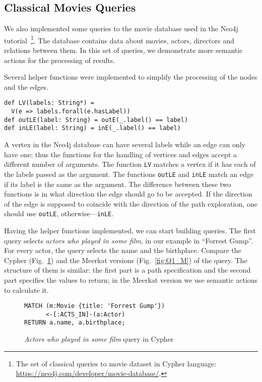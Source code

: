 \subsection{Classical Movies Queries}

We also implemented some queries to the movie database used in the Neo4j tutorial~\footnote{The set of classical queries to movie dataset in Cypher language: \url{https://neo4j.com/developer/movie-database/}.}.
The database contains data about movies, actors, directors and relations between them.
In this set of queries, we demonstrate more semantic actions for the processing of results.

Several helper functions were implemented to simplify the processing of the nodes and the edges.

\begin{lstlisting}
def LV(labels: String*) =
  V(e => labels.forall(e.hasLabel))
def outLE(label: String) = outE(_.label() == label)
def inLE(label: String) = inE(_.label() == label)
\end{lstlisting}

A vertex in the Neo4j database can have several labels while an edge can only have one; thus the functions for the handling of vertices and edges accept a different number of arguments.
The function \lstinline{LV} matches a vertex if it has each of the labels passed as the argument.
The functions \lstinline{outLE} and \lstinline{inLE} match an edge if its label is the same as the argument.
The difference between these two functions is in what direction the edge should go to be accepted.
If the direction of the edge is supposed to coincide with the direction of the path exploration, one should use \lstinline{outLE}, otherwise---\lstinline{inLE}.

Having the helper functions implemented, we can start building queries.
The first query selects \emph{actors who played in some film}, in our example in ``Forrest Gump''.
For every actor, the query selects the name and the birthplace.
Compare the Cypher (Fig.~\ref{fig:Q1_C}) and the Meerkat versions (Fig.~\ref{fig:Q1_M}) of the query.
The structure of them is similar: the first part is a path specification and the second part specifies the values to return; in the Meerkat version we use semantic actions to calculate it.

\begin{figure}[!h]
\begin{lstlisting}
MATCH (m:Movie {title: 'Forrest Gump'})
      <-[:ACTS_IN]-(a:Actor)
RETURN a.name, a.birthplace;
\end{lstlisting}
\caption{\emph{Actors who played in some film} query in Cypher}
\label{fig:Q1_C}
\end{figure}

